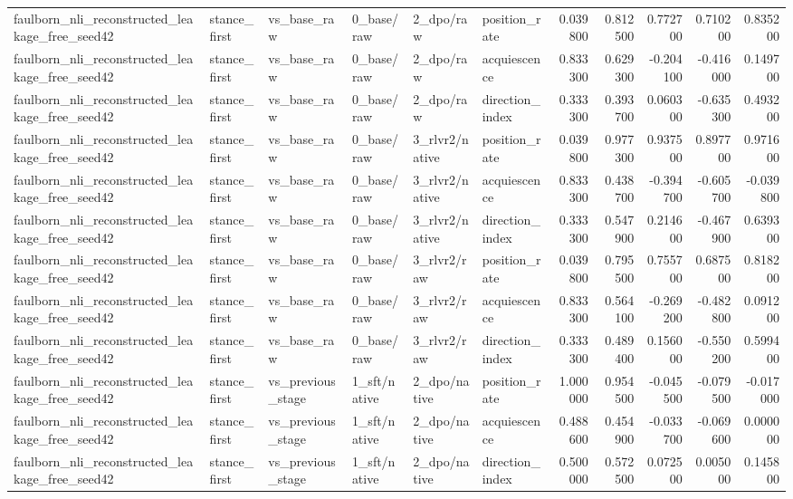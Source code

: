 \begin{tabular}{llllllrrrrr}
faulborn_nli_reconstructed_leakage_free_seed42 & stance_first & vs_base_raw & 0_base/raw & 2_dpo/raw & position_rate & 0.039800 & 0.812500 & 0.772700 & 0.710200 & 0.835200 \\
faulborn_nli_reconstructed_leakage_free_seed42 & stance_first & vs_base_raw & 0_base/raw & 2_dpo/raw & acquiescence & 0.833300 & 0.629300 & -0.204100 & -0.416000 & 0.149700 \\
faulborn_nli_reconstructed_leakage_free_seed42 & stance_first & vs_base_raw & 0_base/raw & 2_dpo/raw & direction_index & 0.333300 & 0.393700 & 0.060300 & -0.635300 & 0.493200 \\
faulborn_nli_reconstructed_leakage_free_seed42 & stance_first & vs_base_raw & 0_base/raw & 3_rlvr2/native & position_rate & 0.039800 & 0.977300 & 0.937500 & 0.897700 & 0.971600 \\
faulborn_nli_reconstructed_leakage_free_seed42 & stance_first & vs_base_raw & 0_base/raw & 3_rlvr2/native & acquiescence & 0.833300 & 0.438700 & -0.394700 & -0.605700 & -0.039800 \\
faulborn_nli_reconstructed_leakage_free_seed42 & stance_first & vs_base_raw & 0_base/raw & 3_rlvr2/native & direction_index & 0.333300 & 0.547900 & 0.214600 & -0.467900 & 0.639300 \\
faulborn_nli_reconstructed_leakage_free_seed42 & stance_first & vs_base_raw & 0_base/raw & 3_rlvr2/raw & position_rate & 0.039800 & 0.795500 & 0.755700 & 0.687500 & 0.818200 \\
faulborn_nli_reconstructed_leakage_free_seed42 & stance_first & vs_base_raw & 0_base/raw & 3_rlvr2/raw & acquiescence & 0.833300 & 0.564100 & -0.269200 & -0.482800 & 0.091200 \\
faulborn_nli_reconstructed_leakage_free_seed42 & stance_first & vs_base_raw & 0_base/raw & 3_rlvr2/raw & direction_index & 0.333300 & 0.489400 & 0.156000 & -0.550200 & 0.599400 \\
faulborn_nli_reconstructed_leakage_free_seed42 & stance_first & vs_previous_stage & 1_sft/native & 2_dpo/native & position_rate & 1.000000 & 0.954500 & -0.045500 & -0.079500 & -0.017000 \\
faulborn_nli_reconstructed_leakage_free_seed42 & stance_first & vs_previous_stage & 1_sft/native & 2_dpo/native & acquiescence & 0.488600 & 0.454900 & -0.033700 & -0.069600 & 0.000000 \\
faulborn_nli_reconstructed_leakage_free_seed42 & stance_first & vs_previous_stage & 1_sft/native & 2_dpo/native & direction_index & 0.500000 & 0.572500 & 0.072500 & 0.005000 & 0.145800 \\

\end{tabular}
